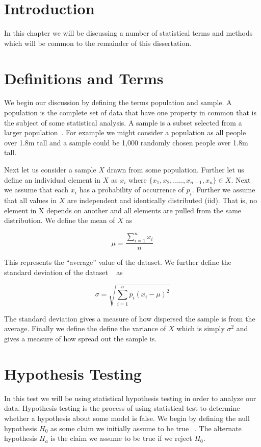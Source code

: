 \section{Introduction}
In this chapter we will be discussing a number of statistical terms and methods which will be common to the remainder of this dissertation. 


\section{Definitions and Terms}
We begin our discussion by defining the terms population and sample. A population is the complete set of data that have one property in common that is the subject of some statistical analysis. A sample is a subset selected from a larger population~\cite{devore_probability_2011}. For example we might consider a population as all people over 1.8m tall and a sample could be 1,000 randomly chosen people over 1.8m tall. 

 Next let us consider a sample $X$ drawn from some population. Further let us define an individual element in $X$ as $x_i$ where $ \{x_1, x_2, ....., x_{n-1}, x_n \} \in X$. Next we assume that each $x_i$ has a probability of occurrence of $p_i$. Further we assume that all values in $X$ are independent and identically distributed (iid). That is, no element in X depends on another and all elements are pulled from the same distribution.  We define the mean of $X$ as~\cite{wackerly_mathematical_2007} 

 \begin{equation}\label{mean}
 	\mu=\frac{\sum_{i=1}^{n} x_i}{n}
 \end{equation} 

This represents the ``average'' value of the dataset. We further define the standard deviation of the dataset ~\cite{wackerly_mathematical_2007} as 

\begin{equation}\label{sigma}
	\sigma = \sqrt{\sum_{i=1}^{n}p_i(x_i-\mu)^2}
\end{equation}

The standard deviation gives a measure of how dispersed the sample is from the average. Finally we define the define the variance of $X$ which is simply $\sigma^2$ and gives a measure of how spread out the sample is. 


\section{Hypothesis Testing}
In this test we will be using statistical hypothesis testing in order to analyze our data. Hypothesis testing is the process of using statistical test to determine whether a hypothesis about some model is false. We begin by defining the null hypothesis $H_0$ as some claim we initially assume to be true ~\cite{devore_probability_2011}. The alternate hypothesis $H_a$ is the claim we assume to be true if we reject $H_0$. 


